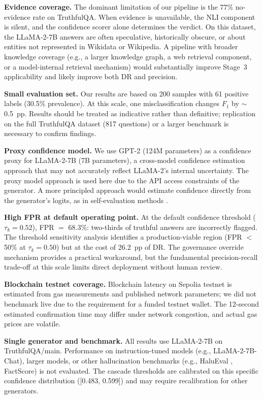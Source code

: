 \documentclass[11pt,a4paper]{article}
\newcommand{\fone}{F_1}
\newcommand{\tauK}{\tau_k}
\begin{document}
\textbf{Evidence coverage.}
The dominant limitation of our pipeline is the 77\% no-evidence rate on
TruthfulQA. When evidence is unavailable, the NLI component is silent, and the
confidence scorer alone determines the verdict. On this dataset, the LLaMA-2-7B
answers are often speculative, historically obscure, or about entities not
represented in Wikidata or Wikipedia. A pipeline with broader knowledge coverage
(e.g., a larger knowledge graph, a web retrieval component, or a model-internal
retrieval mechanism) would substantially improve Stage~3 applicability and likely
improve both DR and precision.

\textbf{Small evaluation set.}
Our results are based on 200 samples with 61 positive labels (30.5\% prevalence).
At this scale, one misclassification changes $\fone$ by $\sim$0.5~pp. Results
should be treated as indicative rather than definitive; replication on the full
TruthfulQA dataset (817 questions) or a larger benchmark is necessary to confirm
findings.

\textbf{Proxy confidence model.}
We use GPT-2 (124M parameters) as a confidence proxy for LLaMA-2-7B (7B
parameters), a cross-model confidence estimation approach that may not accurately
reflect LLaMA-2's internal uncertainty. The proxy model approach is used here
due to the API access constraints of the generator. A more principled approach
would estimate confidence directly from the generator's logits, as in
self-evaluation methods \citep{chuang2023dola}.

\textbf{High FPR at default operating point.}
At the default confidence threshold ($\tauK = 0.52$), FPR $=$ 68.3\%:
two-thirds of truthful answers are incorrectly flagged. The threshold sensitivity
analysis identifies a production-viable region (FPR $<$ 50\% at $\tauK = 0.50$)
but at the cost of 26.2~pp of DR. The governance override mechanism provides a
practical workaround, but the fundamental precision-recall trade-off at this
scale limits direct deployment without human review.

\textbf{Blockchain testnet coverage.}
Blockchain latency on Sepolia testnet is estimated from gas measurements and
published network parameters; we did not benchmark live due to the requirement
for a funded testnet wallet. The 12-second estimated confirmation time may differ
under network congestion, and actual gas prices are volatile.

\textbf{Single generator and benchmark.}
All results use LLaMA-2-7B on TruthfulQA/main. Performance on instruction-tuned
models (e.g., LLaMA-2-7B-Chat), larger models, or other hallucination benchmarks
(e.g., HaluEval \citep{ji2023survey}, FactScore) is not evaluated. The cascade
thresholds are calibrated on this specific confidence distribution ([0.483,
0.599]) and may require recalibration for other generators.
\end{document}
